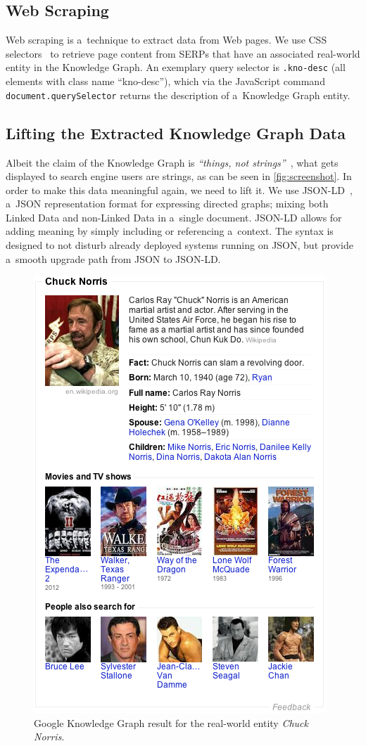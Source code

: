 \documentclass[runningheads,a4paper]{llncs}
\begin{document}
\subsection{Web Scraping}
Web scraping is a~technique to extract data from Web pages.
We use CSS selectors~\cite{hunt2012} to retrieve page content from SERPs
that have an associated real-world entity in the Knowledge Graph.
An exemplary query selector is \texttt{.kno-desc}
(all elements with class name ``kno-desc''),
which via the JavaScript command \texttt{document.querySelector}
returns the description of a~Knowledge Graph entity.

\subsection{Lifting the Extracted Knowledge Graph Data}
Albeit the claim of the Knowledge Graph is
\textit{``things, not strings''}~\cite{singhal2012_1},
what gets displayed to search engine users are strings,
as can be seen in \autoref{fig:screenshot}.
In order to make this data meaningful again, we need to lift it.
We use JSON-LD~\cite{sporny2012}, a~JSON representation format
for expressing directed graphs;
mixing both Linked Data and non-Linked Data in a~single document.
JSON-LD allows for adding meaning by simply including or referencing a~context.
The syntax is designed to not disturb already deployed systems running on JSON,
but provide a~smooth upgrade path from JSON to JSON-LD.

\begin{figure}[htb!]
  \begin{center}
   \includegraphics[width=0.5\linewidth]{./screenshot.png}
  \end{center}  
  \caption{Google Knowledge Graph result for the real-world entity \emph{Chuck Norris}.}
  \label{fig:screenshot}
\end{figure}
\end{document}

